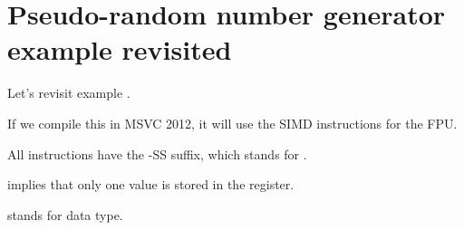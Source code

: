 \section{Pseudo-random number generator example revisited}
\label{FPU_PRNG_SIMD}

Let's revisit  example .

If we compile this in MSVC 2012, it will use the SIMD instructions for the FPU.




All instructions have the -SS suffix, which stands for .

 implies that only one value is stored in the register.

 stands for \Tfloat data type.

